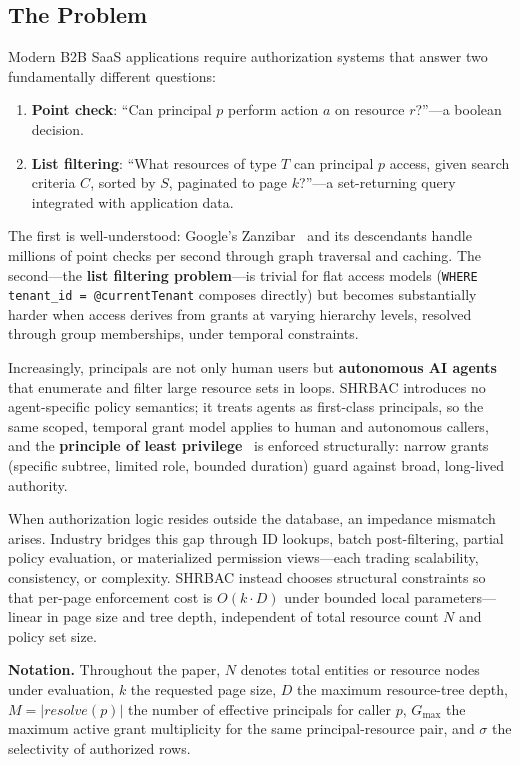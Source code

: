 \documentclass[conference]{IEEEtran}
\begin{document}
\subsection{The Problem}

Modern B2B SaaS applications require authorization systems that answer two fundamentally different questions:

\begin{enumerate}
\item \textbf{Point check}: ``Can principal $p$ perform action $a$ on resource $r$?''---a boolean decision.
\item \textbf{List filtering}: ``What resources of type $T$ can principal $p$ access, given search criteria $C$, sorted by $S$, paginated to page $k$?''---a set-returning query integrated with application data.
\end{enumerate}

The first is well-understood: Google's Zanzibar~\cite{zanzibar} and its descendants handle millions of point checks per second through graph traversal and caching. The second---the \textbf{list filtering problem}---is trivial for flat access models (\texttt{WHERE tenant\_id = @currentTenant} composes directly) but becomes substantially harder when access derives from grants at varying hierarchy levels, resolved through group memberships, under temporal constraints.

Increasingly, principals are not only human users but \textbf{autonomous AI agents} that enumerate and filter large resource sets in loops. SHRBAC introduces no agent-specific policy semantics; it treats agents as first-class principals, so the same scoped, temporal grant model applies to human and autonomous callers, and the \textbf{principle of least privilege}~\cite{saltzer} is enforced structurally: narrow grants (specific subtree, limited role, bounded duration) guard against broad, long-lived authority.

When authorization logic resides outside the database, an impedance mismatch arises. Industry bridges this gap through ID lookups, batch post-filtering, partial policy evaluation, or materialized permission views---each trading scalability, consistency, or complexity. SHRBAC instead chooses structural constraints so that per-page enforcement cost is $O(k \cdot D)$ under bounded local parameters---linear in page size and tree depth, independent of total resource count $N$ and policy set size.

\textbf{Notation.} Throughout the paper, $N$ denotes total entities or resource nodes under evaluation, $k$ the requested page size, $D$ the maximum resource-tree depth, $M=|\mathit{resolve}(p)|$ the number of effective principals for caller $p$, $G_{\max}$ the maximum active grant multiplicity for the same principal-resource pair, and $\sigma$ the selectivity of authorized rows.
\end{document}
